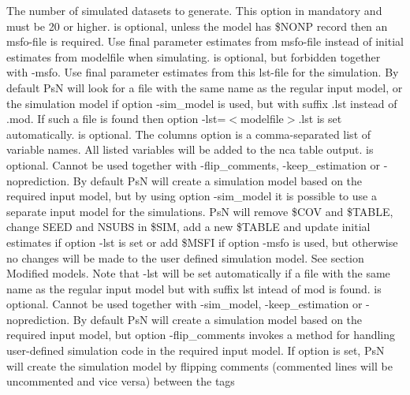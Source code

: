 \begin{optionlist}
The number of simulated datasets to generate. This option in mandatory and must be 20 or higher. 
\nextopt
{}
is optional, unless the model has \$NONP record then an msfo-file	is required. Use final parameter estimates from msfo-file instead of initial estimates from modelfile when simulating.
\nextopt
{}
is optional, but forbidden together with -msfo. Use final parameter estimates from this lst-file for the simulation. By default PsN will look for a file with the same name as the regular input model, or the simulation model if option -sim\_model is used, but with suffix .lst instead of .mod. If such a file is found then option -lst=$<$modelfile$>$.lst is set automatically.
\nextopt
{}
is optional. The columns option is a comma-separated list of variable names. All listed variables will be added to the nca table output.
\nextopt
{}
is optional. Cannot be used together with -flip\_comments, -keep\_estimation or -noprediction. By default PsN will create a simulation model based on the required input model, but by using option -sim\_model it is possible to use a separate input model for the simulations. PsN will remove \$COV and \$TABLE, change SEED and NSUBS in \$SIM, add a new \$TABLE and  update initial estimates if option -lst is set or add \$MSFI if option -msfo is used, but otherwise no changes will be made to the user defined simulation model. See section Modified models. Note that -lst will be set automatically if a file with the same name as the regular input model but with suffix lst intead of mod is found. 
\nextopt
{}
is optional. Cannot be used together with -sim\_model, -keep\_estimation or -noprediction. By default PsN will create a simulation model based on the required input model, but option -flip\_comments invokes a method for handling user-defined simulation code in the required input model. If option is set, PsN will create the simulation model by flipping comments (commented lines will be uncommented and vice versa) between the tags



\end{optionlist}

